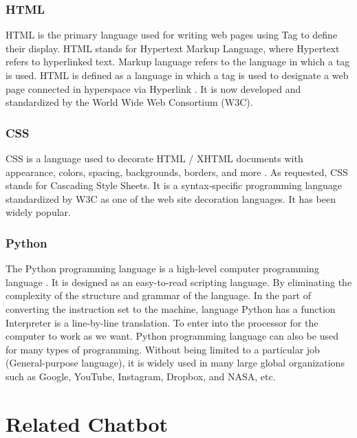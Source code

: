 \documentclass[12pt,oneside,openright,a4paper]{cpe-english-project}
\begin{document}
\subsubsection{HTML}
HTML is the primary language used for writing web pages using Tag to define their display.
HTML stands for Hypertext Markup Language, where Hypertext refers to hyperlinked text.
Markup language refers to the language in which a tag is used.
HTML is defined as a language in which a tag is used to designate a web page connected
in hyperspace via Hyperlink \cite{html_basic}. It is now developed and standardized by
the World Wide Web Consortium (W3C).

\subsubsection{CSS}
CSS is a language used to decorate HTML / XHTML documents with appearance, colors, spacing,
backgrounds, borders, and more \cite{ultimate_guide_css}
. As requested, CSS stands for Cascading Style Sheets. It is a syntax-specific programming
language standardized by W3C as one of the web site decoration languages. It has been widely
popular.

\subsubsection{Python}
The Python programming language is a high-level computer programming language \cite{keras}. 
It is designed as an easy-to-read scripting language. By eliminating the complexity
of the structure and grammar of the language. In the part of converting the instruction
set to the machine, language Python has a function Interpreter is a line-by-line translation.
To enter into the processor for the computer to work as we want. Python programming language
can also be used for many types of programming. Without being limited to a particular
job (General-purpose language), it is widely used in many large global organizations such as
Google, YouTube, Instagram, Dropbox, and NASA, etc.

\section{Related Chatbot}
\end{document}
